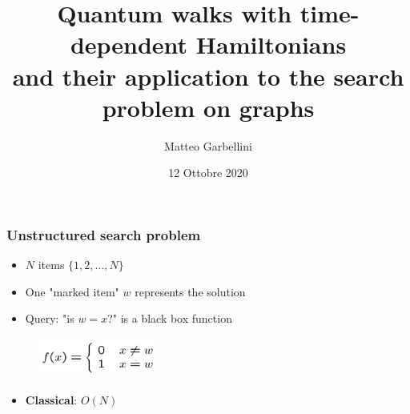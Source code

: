 \documentclass{beamer}
\title[Quantum walks with time-dependent Hamiltonians]{Quantum walks with time-dependent Hamiltonians  \\ and their application to the search problem on graphs}
\author{Matteo Garbellini}
\institute[(UniMi)] 
{
Universit\`a degli Studi di Milano \\ 
\medskip
}
\date{12 Ottobre 2020}
\newcommand{\bb}[1]{\textbf{\textcolor{darkish_blue}{#1}}}
\begin{document}



\begin{frame}
\frametitle{Unstructured search problem}
\begin{itemize}
	\item $N$ items $\{1, 2,..., N\}$
	\item One "marked item" $w$ represents the solution
	\item Query: "is $w=x$?" is a black box function
\end{itemize}
\begin{figure}
	\centering
	\includegraphics[width=4cm]{black_box.png}
\end{figure}
\begin{itemize}
	\item \bb{Classical}: $O(N)$
\end{itemize}

\end{frame}

\end{document}
